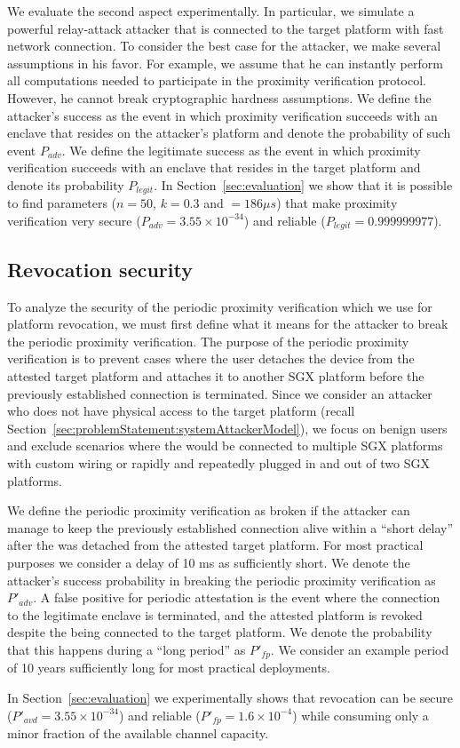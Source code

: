 We evaluate the second aspect experimentally. In particular, we simulate a powerful relay-attack attacker that is connected to the target platform with fast network connection. To consider the best case for the attacker, we make several assumptions in his favor. For example, we assume that he can instantly perform all computations needed to participate in the proximity verification protocol. However, he cannot break cryptographic hardness assumptions. We define the attacker's success as the event in which proximity verification succeeds with an enclave that resides on the attacker's platform and denote the probability of such event $P_{adv}$. We define the legitimate success as the event in which proximity verification succeeds with an enclave that resides in the target platform and denote its probability $P_{legit}$. In Section~\ref{sec:evaluation} we show that it is possible to find parameters ($n=50$, $k=0.3$ and \connect$=186 \mu s$) that make proximity verification very secure ($P_{adv}=3.55\times 10^{-34}$) and reliable ($P_{legit}=0.999999977$).




\subsection{Revocation security}
To analyze the security of the periodic proximity verification which we use for platform revocation, we must first define what it means for the attacker to break the periodic proximity verification. The purpose of the periodic proximity verification is to prevent cases where the user detaches the \device device from the attested target platform and attaches it to another SGX platform before the previously established connection is terminated. Since we consider an attacker who does not have physical access to the target platform (recall Section~\ref{sec:problemStatement:systemAttackerModel}), we focus on benign users and exclude scenarios where the \device would be connected to multiple SGX platforms with custom wiring or rapidly and repeatedly plugged in and out of two SGX platforms.



We define the periodic proximity verification as broken if the attacker can manage to keep the previously established connection alive within a ``short delay'' after the \device was detached from the attested target platform. For most practical purposes we consider a delay of 10 ms as sufficiently short. We denote the attacker's success probability in breaking the periodic proximity verification as $P'_{adv}$.
%
A false positive for periodic attestation is the event where the connection to the legitimate enclave is terminated, and the attested platform is revoked despite the \device being connected to the target platform. We denote the probability that this happens during a ``long period'' as $P'_{fp}$. We consider an example period of 10 years sufficiently long for most practical deployments.

In Section~\ref{sec:evaluation} we experimentally shows that revocation can be secure ($P'_{avd}=3.55\times10^{-34}$) and reliable
($P'_{fp}=1.6\times10^{-4}$) while consuming only a minor fraction of the available channel capacity.

